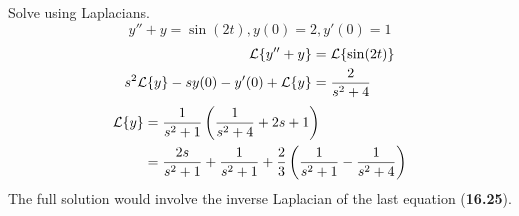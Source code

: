 \documentclass[diffeq.tex]{subfiles}
\begin{document}
    \np
    \begin{example}
        Solve using Laplacians.
        \begin{equation}
            y'' + y = \sin(2t), y(0) = 2, y'(0) = 1
        \end{equation}
        \begin{alignat}{1}
            \mathcal{L}\{y'' + y\} &= \mathcal{L}\{\sin(2t)\}\\
            s^2\mathcal{L}\{y\}-sy(0)-y'(0)+\mathcal{L}\{y\} &= \frac{2}{s^{2} + 4}
        \end{alignat}
        \begin{alignat}{1}
            \mathcal{L}\{y\} &= \frac{1}{s^{2} + 1}\left(\frac{1}{s^2 + 4} + 2s + 1\right)\\
            &= \frac{2s}{s^{2} + 1} + \frac{1}{s^{2} + 1} + \frac{2}{3}\left(\frac{1}{s^{2} + 1} - \frac{1}{s^{2} + 4}\right)
        \end{alignat}
        The full solution would involve the inverse Laplacian of the last equation (\textbf{16.25}).
    \end{example}
\end{document}
